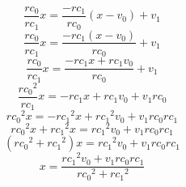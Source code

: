 \documentclass[12pt]{article}
\begin{document}
    \[\frac{rc_0}{rc_1}x = \frac{-rc_1}{rc_0}\left(x-v_0\right)+v_1\]
    \[\frac{rc_0}{rc_1}x = \frac{-rc_1\left(x-v_0\right)}{rc_0}+v_1\]
    \[\frac{rc_0}{rc_1}x = \frac{-rc_1x+rc_1v_0}{rc_0}+v_1\]
    \[\frac{{rc_0}^2}{rc_1}x = -rc_1x+rc_1v_0+v_1rc_0\]
    \[{rc_0}^2x = -{rc_1}^2x+{rc_1}^2v_0+v_1rc_0rc_1\]
    \[{rc_0}^2x+{rc_1}^2x = {rc_1}^2v_0+v_1rc_0rc_1\]
    \[\left({rc_0}^2+{rc_1}^2\right)x = {rc_1}^2v_0+v_1rc_0rc_1\]
    \[x = \frac{{rc_1}^2v_0+v_1rc_0rc_1}{{rc_0}^2+{rc_1}^2}\]
\end{document}
